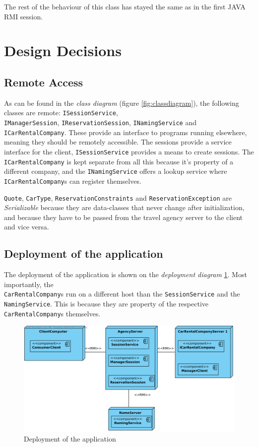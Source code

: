 \documentclass[a4paper]{article}
\begin{document}
The rest of the behaviour of this class has stayed the same as in the first JAVA RMI session.

\section{Design Decisions}

\subsection{Remote Access}
As can be found in the \emph{class diagram} (figure \ref{fig:classdiagram}), the following classes are remote: \texttt{ISessionService}, \\ \texttt{IManagerSession}, \texttt{IReservationSession}, \texttt{INamingService} and \texttt{ICarRentalCompany}. These provide an interface to programs running elsewhere, meaning they should be remotely accessible.
The sessions provide a service interface for the client, \texttt{ISessionService} provides a means to create sessions. The \texttt{ICarRentalCompany} is kept separate from all this because it's property of a different company, and the \texttt{INamingService} offers a lookup service where \texttt{ICarRentalCompany}s can register themselves.

\texttt{Quote}, \texttt{CarType}, \texttt{ReservationConstraints} and \texttt{ReservationException} are \emph{Serializable} because they are data-classes that never change after initialization, and because they have to be passed from the travel agency server to the client and vice versa. 

\subsection{Deployment of the application}
The deployment of the application is shown on the \emph{deployment diagram} \ref{fig:deployment}.
Most importantly, the \\ \texttt{CarRentalCompany}s run on a different host than the \texttt{SessionService} and the \texttt{NamingService}. This is because they are property of the respective \texttt{CarRentalCompany}s themselves. 

\begin{figure}[hbtp]
\centering
\includegraphics[width=\textwidth]{img/Deployment Diagram.png}
\caption{Deployment of the application}
\label{fig:deployment}
\end{figure}
\end{document}
